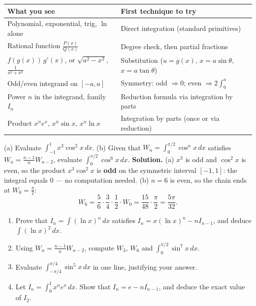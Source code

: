 \documentclass[11pt]{article}
\begin{document}
\begin{center}
\begin{tabularx}{\linewidth}{|l|X|}
\hline
\rowcolor{popblueL} \textbf{What you see} & \textbf{First technique to try} \\
\hline
Polynomial, exponential, trig, $\ln$ alone & Direct integration (standard primitives) \\
\hline
Rational function $\frac{P(x)}{Q(x)}$ & Degree check, then partial fractions \\
\hline
$f(g(x))\,g'(x)$, or $\sqrt{a^2-x^2}$, $\frac{1}{a^2+x^2}$ & Substitution ($u=g(x)$, $x=a\sin\theta$, $x=a\tan\theta$) \\
\hline
Odd/even integrand on $[-a,a]$ & Symmetry: odd $\Rightarrow 0$; even $\Rightarrow 2\int_0^a$ \\
\hline
Power $n$ in the integrand, family $I_n$ & Reduction formula via integration by parts \\
\hline
Product $x^n e^x$, $x^n\sin x$, $x^n\ln x$ & Integration by parts (once or via reduction) \\
\hline
\end{tabularx}
\end{center}

\begin{exoresolu}
(a) Evaluate $\displaystyle\int_{-1}^{1} x^3\cos^2 x\,dx$. \quad (b) Given that $W_n=\int_0^{\pi/2}\cos^n x\,dx$ satisfies $W_n=\frac{n-1}{n}W_{n-2}$, evaluate $\displaystyle\int_0^{\pi/2}\cos^6 x\,dx$.
\tcblower
\textbf{Solution.} (a) $x^3$ is odd and $\cos^2 x$ is even, so the product $x^3\cos^2 x$ is \textbf{odd} on the symmetric interval $[-1,1]$: the integral equals $\boxed{0}$ — no computation needed. (b) $n=6$ is even, so the chain ends at $W_0=\frac{\pi}{2}$:
\[ W_6 = \frac{5}{6}\cdot\frac{3}{4}\cdot\frac{1}{2}\cdot W_0 = \frac{15}{48}\cdot\frac{\pi}{2} = \boxed{\frac{5\pi}{32}}. \]
\end{exoresolu}

\begin{exercice}[Practice]
\begin{enumerate}
\item Prove that $I_n=\int(\ln x)^n\,dx$ satisfies $I_n = x(\ln x)^n - nI_{n-1}$, and deduce $\int(\ln x)^2\,dx$.
\item Using $W_n=\frac{n-1}{n}W_{n-2}$, compute $W_3$, $W_6$ and $\displaystyle\int_0^{\pi/2}\sin^7 x\,dx$.
\item Evaluate $\displaystyle\int_{-\pi/4}^{\pi/4}\sin^5 x\,dx$ in one line, justifying your answer.
\item Let $I_n=\int_0^1 x^n e^x\,dx$. Show that $I_n = e - nI_{n-1}$, and deduce the exact value of $I_2$.
\end{enumerate}
\end{exercice}
\end{document}
